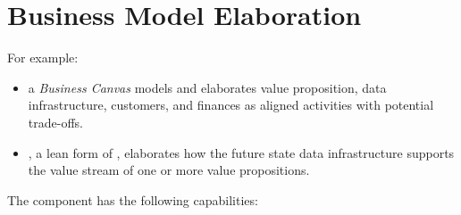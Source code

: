\chapter{Business Model Elaboration}%
\label{ch:ekg-maturity-a-2}
\label{ch:ekg-maturity-business-model-elaboration}



For example:

\begin{itemize}
  \item a \textit{Business Canvas} models and elaborates
        value proposition,
        data infrastructure, customers, and
        finances as aligned activities with potential trade-offs.
  \item {}, a lean form of , elaborates how the future state data infrastructure
        supports the value stream of one or more value propositions.
\end{itemize}

The  component has the following capabilities:

\begin{itemize}[leftmargin=.5in]
\end{itemize}






